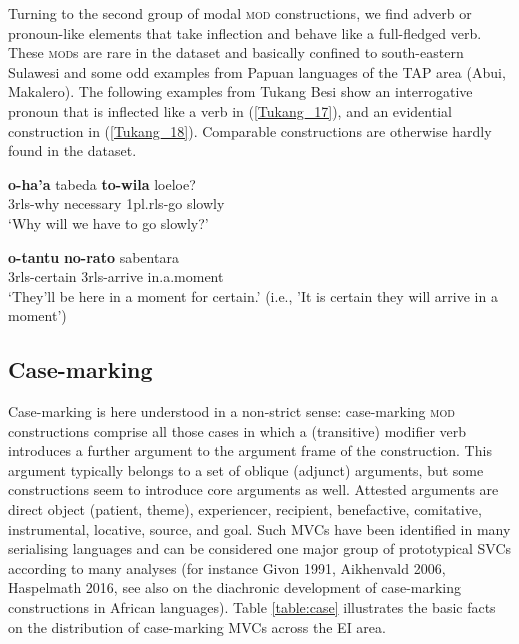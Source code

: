 Turning to the second group of modal \textsc{mod} constructions, we find adverb or pronoun-like elements that take inflection and behave like a full-fledged verb. These \textsc{mod}s are rare in the dataset and basically confined to south-eastern Sulawesi and some odd examples from Papuan languages of the TAP area (Abui, Makalero). The following examples from Tukang Besi show an interrogative pronoun that is inflected like a verb in (\ref{Tukang_17}), and an evidential construction in (\ref{Tukang_18}). Comparable constructions are otherwise hardly found in the dataset.

\ea \label{Tukang_17}
\gll \textbf{o-ha'a} tabeda \textbf{to-wila} loeloe? \\
3\acs{rls}-why necessary 1\acs{pl}.\acs{rls}-go slowly \\
\glft `Why will we have to go slowly?' \\ 
\z
\xe

\ea \label{Tukang_18}
\gll \textbf{o-tantu} \textbf{no-rato} sabentara \\
3\acs{rls}-certain 3\acs{rls}-arrive in.a.moment \\
\glft `They'll be here in a moment for certain.' (i.e., 'It is certain they will arrive in a moment') \\ 
\z
\xe

\subsection{Case-marking} \label{sec:case-marking}

Case-marking is here understood in a non-strict sense: case-marking \textsc{mod} constructions comprise all those cases in which a (transitive) modifier verb introduces a further argument to the argument frame of the construction. This argument typically belongs to a set of oblique (adjunct) arguments, but some constructions seem to introduce core arguments as well. Attested arguments are direct object (patient, theme), experiencer, recipient, benefactive, comitative, instrumental, locative, source, and goal. Such MVCs have been identified in many serialising languages and can be considered one major group of prototypical SVCs according to many analyses (for instance Givon 1991, Aikhenvald 2006, Haspelmath 2016, see also \cite{lord1993historical} on the diachronic development of case-marking constructions in African languages). Table \ref{table:case} illustrates the basic facts on the distribution of case-marking MVCs across the EI area.


